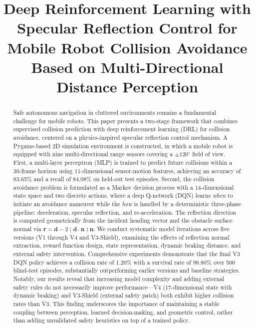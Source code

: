 \documentclass[conference]{IEEEtran}
\begin{document}
\title{Deep Reinforcement Learning with Specular Reflection Control for Mobile Robot Collision Avoidance Based on Multi-Directional Distance Perception}


\maketitle

\begin{abstract}
Safe autonomous navigation in cluttered environments remains a fundamental challenge for mobile robots. This paper presents a two-stage framework that combines supervised collision prediction with deep reinforcement learning (DRL) for collision avoidance, centered on a physics-inspired specular reflection control mechanism. A Pygame-based 2D simulation environment is constructed, in which a mobile robot is equipped with nine multi-directional range sensors covering a $\pm120^\circ$ field of view. First, a multi-layer perceptron (MLP) is trained to predict future collisions within a 30-frame horizon using 11-dimensional sensor-motion features, achieving an accuracy of 83.65\% and a recall of 84.08\% on held-out test episodes. Second, the collision avoidance problem is formulated as a Markov decision process with a 14-dimensional state space and two discrete actions, where a deep Q-network (DQN) learns \emph{when} to initiate an avoidance maneuver while the \emph{how} is handled by a deterministic three-phase pipeline: deceleration, specular reflection, and re-acceleration. The reflection direction is computed geometrically from the incident heading vector and the obstacle surface normal via $\mathbf{r} = \mathbf{d} - 2(\mathbf{d} \cdot \mathbf{n})\mathbf{n}$. We conduct systematic model iterations across five versions (V1 through V4 and V3-Shield), examining the effects of reflection normal extraction, reward function design, state representation, dynamic braking distance, and external safety intervention. Comprehensive experiments demonstrate that the final V3 DQN policy achieves a collision rate of 1.20\% with a survival rate of 98.80\% over 500 blind-test episodes, substantially outperforming earlier versions and baseline strategies. Notably, our results reveal that increasing model complexity and adding external safety rules do not necessarily improve performance---V4 (17-dimensional state with dynamic braking) and V3-Shield (external safety patch) both exhibit higher collision rates than V3. This finding underscores the importance of maintaining a stable coupling between perception, learned decision-making, and geometric control, rather than adding unvalidated safety heuristics on top of a trained policy.
\end{abstract}
\end{document}
